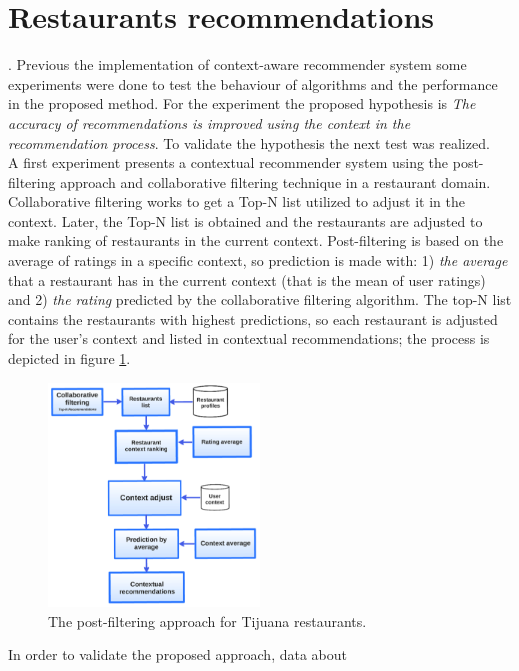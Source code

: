\section{Restaurants recommendations} \label{restaurants}.
Previous the implementation of context-aware recommender system  
some experiments were done to test the behaviour of algorithms 
and the performance in the proposed method. 
For the experiment the proposed hypothesis is \textit{The accuracy of 
recommendations is improved using the context in the 
recommendation process}. To validate the hypothesis the next test  
was realized. \\
A first experiment\cite{ramirez2013restaurant}  presents a  
contextual recommender system using the post-filtering approach and 
collaborative filtering technique in a restaurant domain. 
Collaborative filtering works to get a Top-N list utilized to adjust it in 
the context. 
Later, the Top-N list is obtained and the restaurants are adjusted to 
make ranking of restaurants  in the current context. Post-filtering is
based on the average  of ratings in a specific context, so prediction
is made with: 1) \textit{the average} that a restaurant has in the
current context (that is the  mean of user ratings) and 2) 
\textit{the rating} predicted by the collaborative filtering algorithm. 
The top-N list contains the restaurants with highest predictions, 
so each restaurant is adjusted for the user's context and listed in 
contextual recommendations; the process is depicted in figure
\ref{fig:postfiltering}.
\begin{figure}
\centering
\captionsetup{font=footnotesize}
\setlength\fboxsep{0pt}
\includegraphics[width=0.50\textwidth]{img/posfil.png}
\caption{The post-filtering approach for Tijuana restaurants.}
\label{fig:postfiltering}     
\end{figure}
In order to validate the proposed approach,  data  about 
